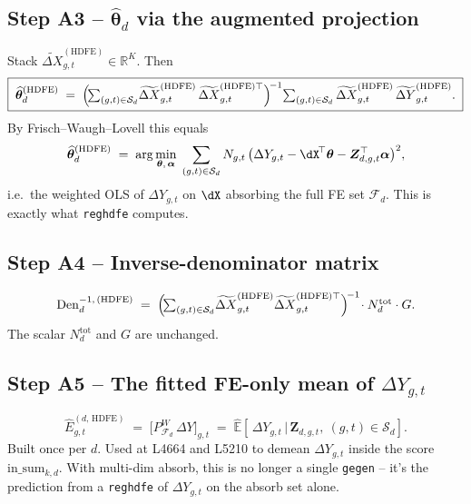 \documentclass[11pt]{article}
\newcommand{\R}{\mathbb{R}}
\newcommand{\E}{\mathbb{E}}
\newcommand{\1}{\mathbb{1}}
\newcommand{\Smpl}{\mathcal{S}}
\newcommand{\thetad}{\widehat{\bm{\theta}}_d}
\newcommand{\Ngt}{N_{g,t}}
\newcommand{\dY}{\Delta Y_{g,t}}
\newcommand{\PdW}{P^{\!W}_{\mathcal{F}_d}}
\begin{document}
\subsection*{Step A3 -- $\thetad$ via the augmented projection}

Stack $\widetilde{\Delta X}^{(\mathrm{HDFE})}_{g,t}\in\R^{K}$. Then
\begin{equation}
\boxed{\;
\thetad^{(\mathrm{HDFE})} \;=\;
\Bigl(\!\textstyle\sum_{(g,t)\in\Smpl_d}\!\widetilde{\Delta X}^{(\mathrm{HDFE})}_{g,t}\,\widetilde{\Delta X}^{(\mathrm{HDFE})\top}_{g,t}\Bigr)^{\!-1}\!
\textstyle\sum_{(g,t)\in\Smpl_d}\widetilde{\Delta X}^{(\mathrm{HDFE})}_{g,t}\,\widetilde{\Delta Y}^{(\mathrm{HDFE})}_{g,t}.
\;}
\label{eq:thetanew}
\end{equation}
By Frisch--Waugh--Lovell this equals
\begin{equation}
\thetad^{(\mathrm{HDFE})} \;=\;
\arg\min_{\bm{\theta},\,\bm{\alpha}}\;
\sum_{(g,t)\in\Smpl_d} \Ngt\,\bigl(\dY - \dX^{\!\top}\bm{\theta} - \bm{Z}^{\top}_{d,g,t}\bm{\alpha}\bigr)^{2},
\label{eq:fwlnew}
\end{equation}
i.e.\ the weighted OLS of $\dY$ on $\dX$ absorbing the full FE set
$\mathcal{F}_d$. This is exactly what \texttt{reghdfe} computes.

\subsection*{Step A4 -- Inverse-denominator matrix}
\begin{equation}
\mathrm{Den}_d^{-1,\,(\mathrm{HDFE})} \;=\;
\Bigl(\!\textstyle\sum_{(g,t)\in\Smpl_d}\!\widetilde{\Delta X}^{(\mathrm{HDFE})}_{g,t}\widetilde{\Delta X}^{(\mathrm{HDFE})\top}_{g,t}\Bigr)^{\!-1}\!\cdot N_d^{\mathrm{tot}}\cdot G.
\label{eq:DenInvNew}
\end{equation}
The scalar $N_d^{\mathrm{tot}}$ and $G$ are unchanged.

\subsection*{Step A5 -- The fitted FE-only mean of $\dY$}
\begin{equation}
\widehat{E}_{g,t}^{(d,\,\mathrm{HDFE})} \;=\; \bigl[\PdW\,\Delta Y\bigr]_{g,t}
\;=\; \widehat{\E}\!\left[\,\dY\,\Big|\,\bm{Z}_{d,g,t},\ (g,t)\in\Smpl_d\right].
\label{eq:Ehatnew}
\end{equation}
Built once per $d$. Used at L4664 and L5210 to demean $\dY$ inside the score
$\mathrm{in\_sum}_{k,d}$. With multi-dim absorb, this is no longer a
single \texttt{gegen} -- it's the prediction from a \texttt{reghdfe} of $\dY$
on the absorb set alone.
\end{document}
